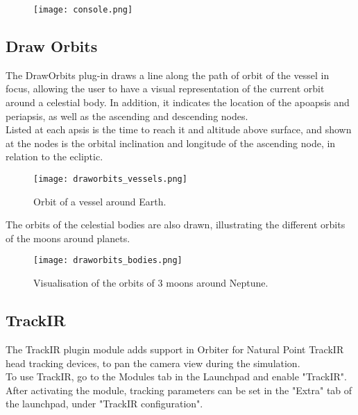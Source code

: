 \documentclass[Orbiter User Manual.tex]{subfiles}
\begin{document}
\begin{figure}[H]
	\centering
	\texttt{[image: console.png]}
\end{figure}


\subsection{Draw Orbits}

\noindent
The DrawOrbits plug-in draws a line along the path of orbit of the vessel in focus, allowing the user to have a visual representation of the current orbit around a celestial body. In addition, it indicates the location of the apoapsis and periapsis, as well as the ascending and descending nodes.\\
Listed at each apsis is the time to reach it and altitude above surface, and shown at the nodes is the orbital inclination and longitude of the ascending node, in relation to the ecliptic.

\begin{figure}[H]
	\centering
	\texttt{[image: draworbits\_vessels.png]}
	\caption{Orbit of a vessel around Earth.}
\end{figure}

\noindent
The orbits of the celestial bodies are also drawn, illustrating the different orbits of the moons around planets.

\begin{figure}[H]
	\centering
	\texttt{[image: draworbits\_bodies.png]}
	\caption{Visualisation of the orbits of 3 moons around Neptune.}
\end{figure}


\subsection{TrackIR}
\label{ssec:trackir}
The TrackIR plugin module adds support in Orbiter for Natural Point TrackIR head tracking devices, to pan the camera view during the simulation.\\
To use TrackIR, go to the Modules tab in the Launchpad and enable "TrackIR". After activating the module, tracking parameters can be set in the "Extra" tab of the launchpad, under "TrackIR configuration".
\end{document}
